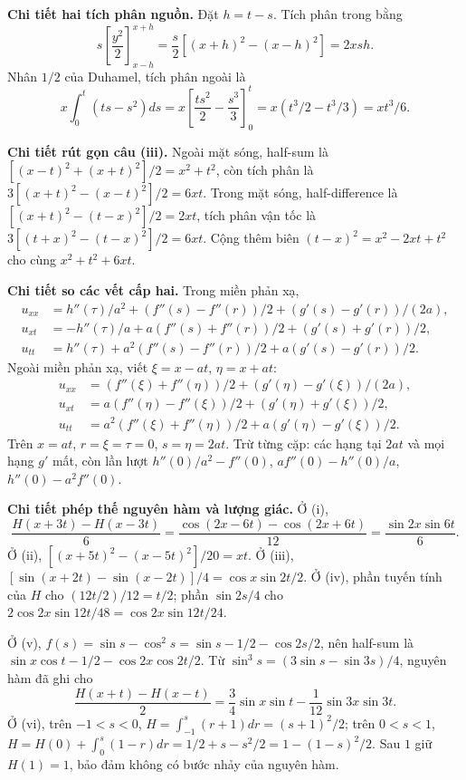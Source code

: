 \textbf{Chi tiết hai tích phân nguồn.} Đặt $h=t-s$. Tích phân trong bằng
\[s\left[\frac{y^2}{2}\right]_{x-h}^{x+h}
=\frac s2[(x+h)^2-(x-h)^2]=2xsh.\]
Nhân $1/2$ của Duhamel, tích phân ngoài là
\[x\int_0^t(ts-s^2)ds=x\left[\frac{ts^2}{2}-\frac{s^3}{3}\right]_0^t
=x(t^3/2-t^3/3)=xt^3/6.\]

\textbf{Chi tiết rút gọn câu (iii).} Ngoài mặt sóng, half-sum là $[(x-t)^2+(x+t)^2]/2=x^2+t^2$, còn tích phân là $3[(x+t)^2-(x-t)^2]/2=6xt$. Trong mặt sóng, half-difference là $[(x+t)^2-(t-x)^2]/2=2xt$, tích phân vận tốc là $3[(t+x)^2-(t-x)^2]/2=6xt$. Cộng thêm biên $(t-x)^2=x^2-2xt+t^2$ cho cùng $x^2+t^2+6xt$.

\textbf{Chi tiết so các vết cấp hai.} Trong miền phản xạ,
\[\begin{aligned}
u_{xx}&=h''(\tau)/a^2+(f''(s)-f''(r))/2+(g'(s)-g'(r))/(2a),\\
u_{xt}&=-h''(\tau)/a+a(f''(s)+f''(r))/2+(g'(s)+g'(r))/2,\\
u_{tt}&=h''(\tau)+a^2(f''(s)-f''(r))/2+a(g'(s)-g'(r))/2.
\end{aligned}\]
Ngoài miền phản xạ, viết $\xi=x-at$, $\eta=x+at$:
\[\begin{aligned}
u_{xx}&=(f''(\xi)+f''(\eta))/2+(g'(\eta)-g'(\xi))/(2a),\\
u_{xt}&=a(f''(\eta)-f''(\xi))/2+(g'(\eta)+g'(\xi))/2,\\
u_{tt}&=a^2(f''(\xi)+f''(\eta))/2+a(g'(\eta)-g'(\xi))/2.
\end{aligned}\]
Trên $x=at$, $r=\xi=\tau=0$, $s=\eta=2at$. Trừ từng cặp: các hạng tại $2at$ và mọi hạng $g'$ mất, còn lần lượt $h''(0)/a^2-f''(0)$, $af''(0)-h''(0)/a$, $h''(0)-a^2f''(0)$.

\textbf{Chi tiết phép thế nguyên hàm và lượng giác.} Ở (i),
\[\frac{H(x+3t)-H(x-3t)}6
=\frac{\cos(2x-6t)-\cos(2x+6t)}{12}
=\frac{\sin2x\sin6t}{6}.\]
Ở (ii), $[(x+5t)^2-(x-5t)^2]/20=xt$. Ở (iii), $[\sin(x+2t)-\sin(x-2t)]/4=\cos x\sin2t/2$. Ở (iv), phần tuyến tính của $H$ cho $(12t/2)/12=t/2$; phần $\sin2s/4$ cho $2\cos2x\sin12t/48=\cos2x\sin12t/24$.

Ở (v), $f(s)=\sin s-\cos^2s=\sin s-1/2-\cos2s/2$, nên half-sum là $\sin x\cos t-1/2-\cos2x\cos2t/2$. Từ $\sin^3s=(3\sin s-\sin3s)/4$, nguyên hàm đã ghi cho
\[\frac{H(x+t)-H(x-t)}2=\frac34\sin x\sin t-\frac1{12}\sin3x\sin3t.\]
Ở (vi), trên $-1<s<0$, $H=\int_{-1}^s(r+1)dr=(s+1)^2/2$; trên $0<s<1$, $H=H(0)+\int_0^s(1-r)dr=1/2+s-s^2/2=1-(1-s)^2/2$. Sau $1$ giữ $H(1)=1$, bảo đảm không có bước nhảy của nguyên hàm.


